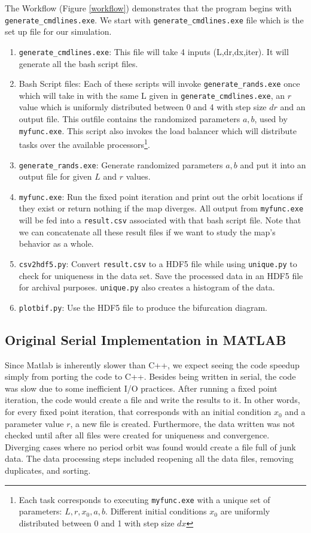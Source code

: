 \documentclass[12pt]{article}
\newcommand{\be}{\begin{enumerate}}
\newcommand{\ee}{\end{enumerate}}
\begin{document}
The Workflow (Figure \ref{workflow}) demonstrates that the program
begins with \texttt{generate\_cmdlines.exe}. We start with
\texttt{generate\_cmdlines.exe} file which is the set up file for our
simulation.
\be
\item \texttt{generate\_cmdlines.exe}: This file will take 4 inputs (L,dr,dx,iter). It will generate all the bash script files. 
\item Bash Script files: Each of these scripts will invoke
\texttt{generate\_rands.exe} once which will take in with the same L
given in \texttt{generate\_cmdlines.exe}, an $r$ value which is
uniformly distributed between 0 and 4 with step size $dr$ and an output
file. This outfile contains the randomized parameters $a,b$, used by
\texttt{myfunc.exe}. This script also invokes the load balancer which
will distribute tasks over the available processors\footnote{Each task
  corresponds to executing \texttt{myfunc.exe} with a unique set of
  parameters: $L,r,x_0,a,b$. Different initial conditions $x_0$ are
  uniformly distributed between 0 and 1 with step size $dx$}.
\item \texttt{generate\_rands.exe}: Generate randomized parameters $a,b$ and put it into an output file for given $L$ and $r$ values.
\item \texttt{myfunc.exe}: Run the fixed point iteration and print out
  the orbit locations if they exist or return nothing if the map
  diverges. All output from \texttt{myfunc.exe} will be fed into a \texttt{result.csv} associated with that bash script file. Note that we can concatenate all these result files if we want to study the map's behavior as a whole. 
\item \texttt{csv2hdf5.py}: Convert \texttt{result.csv} to a HDF5 file
  while using \texttt{unique.py} to check for uniqueness in the data
  set. Save the processed data in an HDF5 file for archival
  purposes. \texttt{unique.py} also creates a histogram of the data.
\item \texttt{plotbif.py}: Use the HDF5 file to produce the bifurcation diagram. 
\ee

\subsection{Original Serial Implementation in MATLAB}
\hspace{5mm} Since Matlab is inherently slower than C++, we expect seeing the code
speedup simply from porting the code to C++. Besides being written in serial, the code was slow due to some
inefficient I/O practices. After running a fixed point iteration, the
code would create a file and write the results to it. In other words,
for every fixed point iteration, that corresponds with an initial
condition $x_0$ and a parameter value $r$, a new file is
created. Furthermore, the data written was not checked until after all
files were created for uniqueness and convergence. Diverging cases
where no period orbit was found would create a file full of junk
data. The data processing steps included reopening all the data files,
removing duplicates, and sorting. 
\end{document}
